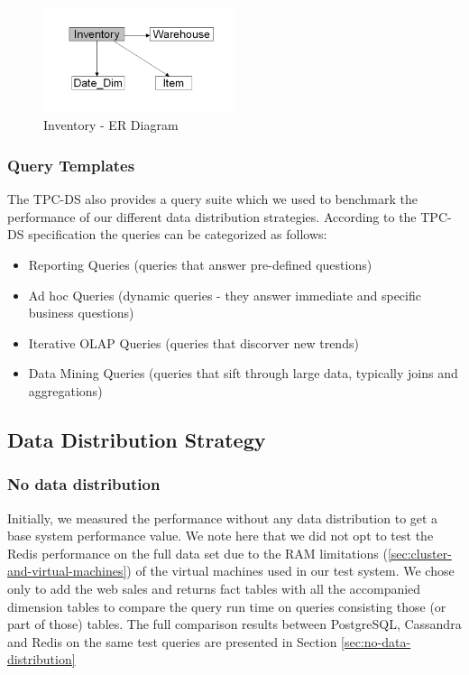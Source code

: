 \documentclass[conference]{IEEEtran}
\begin{document}
\begin{figure}[h]
    \centering
    \includegraphics[width=0.5\textwidth]{images/ER_Diagrams/Inventory - ER Diagram.png}
    \caption{Inventory - ER Diagram}
    \label{fig:inventory_er_diagram}
\end{figure}

\subsubsection{Query Templates}

The TPC-DS also provides a query suite which we used to benchmark the performance of our different data distribution strategies. According to the TPC-DS specification \cite{b1} the queries can be categorized as follows:

\begin{itemize}
    \item \textbf{} Reporting Queries (queries that answer pre-defined questions)
    \item \textbf{} Ad hoc Queries (dynamic queries - they answer immediate and specific business questions)
    \item \textbf{} Iterative OLAP Queries (queries that discorver new trends)
    \item \textbf{} Data Mining Queries (queries that sift through large data, typically joins and aggregations)
\end{itemize}

\subsection{Data Distribution Strategy}

\subsubsection{No data distribution}

Initially, we measured the performance without any data distribution to get a base system performance value. We note here that we did not opt to test the Redis performance on the full data set due to the RAM limitations (\ref{sec:cluster-and-virtual-machines}) of the virtual machines used in our test system. We chose only to add the web sales and returns fact tables with all the accompanied dimension tables to compare the query run time on queries consisting those (or part of those) tables. The full comparison results between PostgreSQL, Cassandra and Redis on the same test queries are presented in Section \ref{sec:no-data-distribution}
\end{document}
